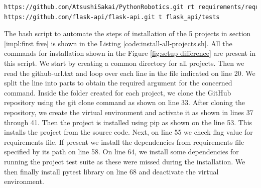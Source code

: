 \lstset{numbers=left, numberstyle=\tiny, stepnumber=1, numbersep=5pt, columns=flexible, breaklines=true}
\lstset{basicstyle=\ttfamily}
\lstset{frame=tb}

\begin{lstlisting}[float,caption=Sample Entry github-url.txt,label=code:github-url-2,language=Bash]
https://github.com/AtsushiSakai/PythonRobotics.git rt requirements/requirements.txt tests
https://github.com/flask-api/flask-api.git t flask_api/tests
\end{lstlisting}

The bash script to automate the steps of installation of the 5 projects in section \ref{impl:first five} is shown in the Listing \ref{code:install-all-projects.sh}.
All the commands for installation shown in the Figure \ref{fig:setup difference} are present in this script.
We start by creating a common directory for all projects. 
Then we read the github-url.txt and loop over each line in the file indicated on line 20.
We split the line into parts to obtain the required argument for the concerned command.
Inside the folder created for each project, we clone the GitHub repository using the git clone command as shown on line 33.
After cloning the repository, we create the virtual environment and activate it as shown in lines 37 through 41.
Then the project is installed using pip as shown on the line 53.
This installs the project from the source code.
Next, on line 55 we check flag value for requirements file.
If present we install the dependencies from requirements file specified by its path on line 58.
On line 64, we install some dependencies for running the project test suite as these were missed during the installation.
We then finally install pytest library on line 68 and deactivate the virtual environment. 

\lstset{numbers=left, numberstyle=\tiny, stepnumber=1, numbersep=5pt, columns=flexible, breaklines=true, numberblanklines=false}
\lstset{basicstyle=\ttfamily}
\lstset{frame=tb}

